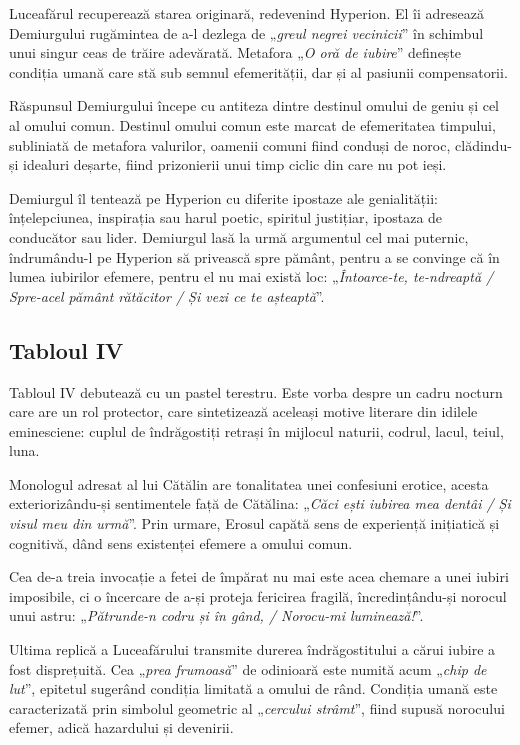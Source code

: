 \documentclass{article}
\newcommand{\qu}[1]{„\emph{#1}”}
\begin{document}
Luceafărul recuperează starea originară, redevenind Hyperion. El îi adresează Demiurgului rugămintea de a-l dezlega de \qu{greul negrei vecinicii} în schimbul unui singur ceas de trăire adevărată. Metafora \qu{O oră de iubire} definește condiția umană care stă sub semnul efemerității, dar și al pasiunii compensatorii.

Răspunsul Demiurgului începe cu antiteza dintre destinul omului de geniu și cel al omului comun. Destinul omului comun este marcat de efemeritatea timpului, subliniată de metafora valurilor, oamenii comuni fiind conduși de noroc, clădindu-și idealuri deșarte, fiind prizonierii unui timp ciclic din care nu pot ieși.

Demiurgul îl tentează pe Hyperion cu diferite ipostaze ale genialității: înțelepciunea, inspirația sau harul poetic, spiritul justițiar, ipostaza de conducător sau lider. Demiurgul lasă la urmă argumentul cel mai puternic, îndrumându-l pe Hyperion să privească spre pământ, pentru a se convinge că în lumea iubirilor efemere, pentru el nu mai există loc: \qu{Întoarce-te, te-ndreaptă / Spre-acel pământ rătăcitor / Și vezi ce te așteaptă}.

\subsection{Tabloul IV}
Tabloul IV debutează cu un pastel terestru. Este vorba despre un cadru nocturn care are un rol protector, care sintetizează aceleași motive literare din idilele eminesciene: cuplul de îndrăgostiți retrași în mijlocul naturii, codrul, lacul, teiul, luna.

Monologul adresat al lui Cătălin are tonalitatea unei confesiuni erotice, acesta exteriorizându-și sentimentele față de Cătălina: \qu{Căci ești iubirea mea dentâi / Și visul meu din urmă}. Prin urmare, Erosul capătă sens de experiență inițiatică și cognitivă, dând sens existenței efemere a omului comun.

Cea de-a treia invocație a fetei de împărat nu mai este acea chemare a unei iubiri imposibile, ci o încercare de a-și proteja fericirea fragilă, încredințându-și norocul unui astru: \qu{Pătrunde-n codru și în gând, / Norocu-mi luminează!}.

Ultima replică a Luceafărului transmite durerea îndrăgostitului a cărui iubire a fost disprețuită. Cea \qu{prea frumoasă} de odinioară este numită acum \qu{chip de lut}, epitetul sugerând condiția limitată a omului de rând. Condiția umană este caracterizată prin simbolul geometric al \qu{cercului strâmt}, fiind supusă norocului efemer, adică hazardului și devenirii.
\end{document}
